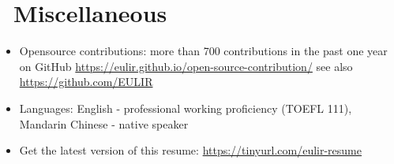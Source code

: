 \documentclass{resume}
\begin{document}

\section{\faInfo\ Miscellaneous}
\begin{itemize}[parsep=0.5ex]
  \item Opensource contributions: more than 700 contributions in the past one year on GitHub \url{https://eulir.github.io/open-source-contribution/} 
    see also {\url{https://github.com/EULIR}}
  \item Languages: English - professional working proficiency (TOEFL 111), Mandarin Chinese - native speaker
  \item Get the latest version of this resume: \url{https://tinyurl.com/eulir-resume}
\end{itemize}
\end{document}
